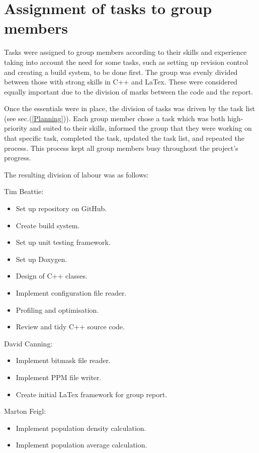 \section{Assignment of tasks to group members}
\label{Assignment of tasks to group members}

Tasks were assigned to group members according to their skills and experience taking into account the need for some tasks, such as setting up revision control and creating a build system, to be done first.  
The group was evenly divided between those with strong skills in C++ and LaTex.  
These were considered equally important due to the division of marks between the code and the report.

Once the essentials were in place, the division of tasks was driven by the task list (see sec.(\ref{Planning})).  
Each group member chose a task which was both high-priority and suited to their skills, informed the group that they were working on that specific task, completed the task, updated the task list, and repeated the process.  
This process kept all group members busy throughout the project's progress.

The resulting division of labour was as follows:

Tim Beattie:
\begin{itemize}
	\item Set up repository on GitHub.
	\item Create build system.
	\item Set up unit testing framework.
	\item Set up Doxygen.
	\item Design of C++ classes.
	\item Implement configuration file reader.
	\item Profiling and optimisation.
	\item Review and tidy C++ source code.
\end{itemize}

David Canning:
\begin{itemize}
	\item Implement bitmask file reader.
	\item Implement PPM file writer.
	\item Create initial LaTex framework for group report.
\end{itemize}


Marton Feigl:
\begin{itemize}
	\item Implement population density calculation.
	\item Implement population average calculation.
\end{itemize}

